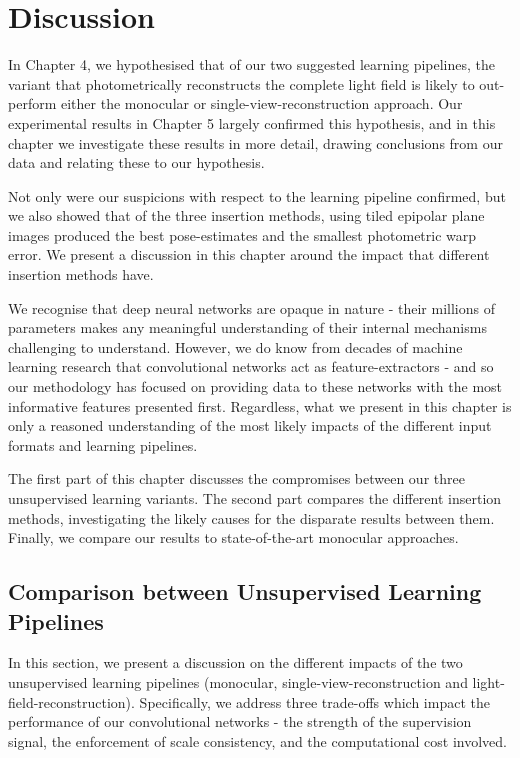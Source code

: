 \chapter{Discussion}

In Chapter 4, we hypothesised that of our two suggested learning pipelines, the variant that photometrically reconstructs the complete light field is likely to out-perform either the monocular or single-view-reconstruction approach. Our experimental results in Chapter 5 largely confirmed this hypothesis, and in this chapter we investigate these results in more detail, drawing conclusions from our data and relating these to our hypothesis. 

Not only were our suspicions with respect to the learning pipeline confirmed, but we also showed that of the three insertion methods, using tiled epipolar plane images produced the best pose-estimates and the smallest photometric warp error. We present a discussion in this chapter around the impact that different insertion methods have.

We recognise that deep neural networks are opaque in nature - their millions of parameters makes any meaningful understanding of their internal mechanisms challenging to understand. However, we do know from decades of machine learning research that convolutional networks act as feature-extractors - and so our methodology has focused on providing data to these networks with the most informative features presented first. Regardless, what we present in this chapter is only a reasoned understanding of the most likely impacts of the different input formats and learning pipelines.  

The first part of this chapter discusses the compromises between our three unsupervised learning variants. The second part compares the different insertion methods, investigating the likely causes for the disparate results between them. Finally, we compare our results to state-of-the-art monocular approaches. 


\section{Comparison between Unsupervised Learning Pipelines}

In this section, we present a discussion on the different impacts of the two unsupervised learning pipelines (monocular, single-view-reconstruction and light-field-reconstruction). Specifically, we address three trade-offs which impact the performance of our convolutional networks - the strength of the supervision signal, the enforcement of scale consistency, and the computational cost involved. 

